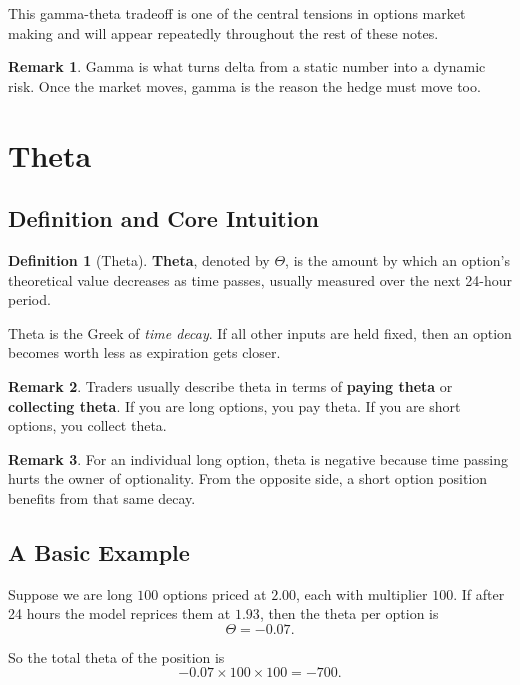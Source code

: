 \documentclass[11pt]{article}
\theoremstyle{definition}
\newtheorem{definition}{Definition}[section]
\newtheorem{remark}{Remark}[section]
\begin{document}
This gamma-theta tradeoff is one of the central tensions in options market making and will appear repeatedly throughout the rest of these notes.


\begin{remark}
Gamma is what turns delta from a static number into a dynamic risk. Once the market moves, gamma is the reason the hedge must move too.
\end{remark}

\section{Theta}

\subsection{Definition and Core Intuition}

\begin{definition}[Theta]
\textbf{Theta}, denoted by \(\Theta\), is the amount by which an option's theoretical value decreases as time passes, usually measured over the next 24-hour period.
\end{definition}

Theta is the Greek of \emph{time decay}. If all other inputs are held fixed, then an option becomes worth less as expiration gets closer.

\begin{remark}
Traders usually describe theta in terms of \textbf{paying theta} or \textbf{collecting theta}. If you are long options, you pay theta. If you are short options, you collect theta.
\end{remark}

\begin{remark}
For an individual long option, theta is negative because time passing hurts the owner of optionality. From the opposite side, a short option position benefits from that same decay.
\end{remark}

\subsection{A Basic Example}

Suppose we are long \(100\) options priced at \(2.00\), each with multiplier \(100\). If after 24 hours the model reprices them at \(1.93\), then the theta per option is
\[
\Theta = -0.07.
\]

So the total theta of the position is
\[
-0.07 \times 100 \times 100 = -700.
\]
\end{document}
